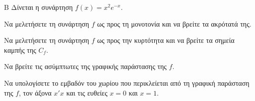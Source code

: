 \begin{thema}{Β}
Δίνεται η συνάρτηση $f(x) = x^2 e^{-x}$.
\begin{erwthma}
\item Να μελετήσετε τη συνάρτηση $f$ ως προς τη μονοτονία και να βρείτε τα ακρότατά της.
\item Να μελετήσετε τη συνάρτηση $f$ ως προς την κυρτότητα και να βρείτε τα σημεία καμπής της $C_f$.
\item Να βρείτε τις ασύμπτωτες της γραφικής παράστασης της $f$.
\item Να υπολογίσετε το εμβαδόν του χωρίου που περικλείεται από τη γραφική παράσταση της $f$, τον άξονα $x'x$ και τις ευθείες $x=0$ και $x=1$.
\end{erwthma}
\end{thema}
